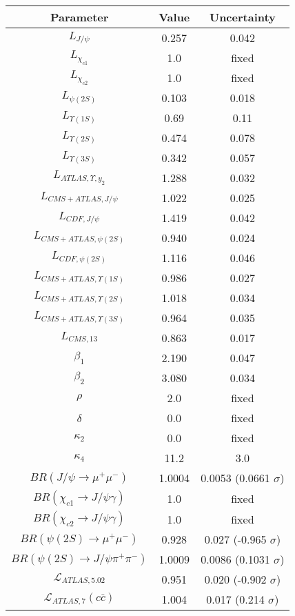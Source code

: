 \begin{table}[h!]
\centering
\begin{tabular}{c|c|c}
Parameter & Value & Uncertainty \\
\hline
$L_{J/\psi}$ & 0.257 & 0.042 \\
$L_{\chi_{c1}}$ & 1.0 & fixed \\
$L_{\chi_{c2}}$ & 1.0 & fixed \\
$L_{\psi(2S)}$ & 0.103 & 0.018 \\
$L_{\Upsilon(1S)}$ & 0.69 & 0.11 \\
$L_{\Upsilon(2S)}$ & 0.474 & 0.078 \\
$L_{\Upsilon(3S)}$ & 0.342 & 0.057 \\
$L_{ATLAS,\Upsilon,y_2}$ & 1.288 & 0.032 \\
$L_{CMS+ATLAS,J/\psi}$ & 1.022 & 0.025 \\
$L_{CDF,J/\psi}$ & 1.419 & 0.042 \\
$L_{CMS+ATLAS,\psi(2S)}$ & 0.940 & 0.024 \\
$L_{CDF,\psi(2S)}$ & 1.116 & 0.046 \\
$L_{CMS+ATLAS,\Upsilon(1S)}$ & 0.986 & 0.027 \\
$L_{CMS+ATLAS,\Upsilon(2S)}$ & 1.018 & 0.034 \\
$L_{CMS+ATLAS,\Upsilon(3S)}$ & 0.964 & 0.035 \\
$L_{CMS,13}$ & 0.863 & 0.017 \\
$\beta_1$ & 2.190 & 0.047 \\
$\beta_2$ & 3.080 & 0.034 \\
$\rho$ & 2.0 & fixed \\
$\delta$ & 0.0 & fixed \\
$\kappa_2$ & 0.0 & fixed \\
$\kappa_4$ & 11.2 & 3.0 \\
$BR(J/\psi\rightarrow\mu^+\mu^-)$ & 1.0004 & 0.0053 (0.0661 $\sigma$) \\
$BR(\chi_{c1}\rightarrow J/\psi\gamma)$ & 1.0 & fixed \\
$BR(\chi_{c2}\rightarrow J/\psi\gamma)$ & 1.0 & fixed \\
$BR(\psi(2S)\rightarrow\mu^+\mu^-)$ & 0.928 & 0.027 (-0.965 $\sigma$) \\
$BR(\psi(2S)\rightarrow J/\psi\pi^+\pi^-)$ & 1.0009 & 0.0086 (0.1031 $\sigma$) \\
$\mathcal L_{ATLAS,5.02}$ & 0.951 & 0.020 (-0.902 $\sigma$) \\
$\mathcal L_{ATLAS,7}(c\overline c)$ & 1.004 & 0.017 (0.214 $\sigma$) \\

\end{tabular}
\end{table}
